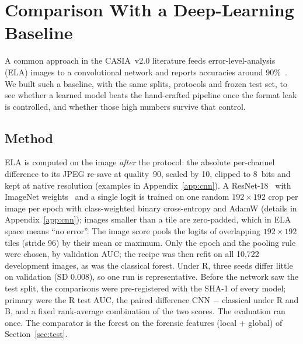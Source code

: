 \section{Comparison With a Deep-Learning Baseline}\label{sec:cnn}

A common approach in the CASIA~v2.0 literature feeds error-level-analysis (ELA) images to a convolutional network and
reports accuracies around 90\%~\cite{sudiatmika2019ela,ali2022recompress}. We built such a baseline, with the same
splits, protocols and frozen test set, to see whether a learned model beats the hand-crafted pipeline once the format
leak is controlled, and whether those high numbers survive that control.

\subsection{Method}\label{sec:cnn-method}

ELA is computed on the image \emph{after} the protocol: the absolute per-channel difference to its JPEG re-save at
quality~90, scaled by 10, clipped to 8~bits and kept at native resolution (examples in Appendix~\ref{app:cnn}). A
ResNet-18~\cite{he2016resnet} with ImageNet weights~\cite{deng2009imagenet} and a single logit is trained on one random
$192\times192$ crop per image per epoch with class-weighted binary cross-entropy and AdamW (details in
Appendix~\ref{app:cnn}); images smaller than a tile are zero-padded, which in ELA space means ``no error''. The image
score pools the logits of overlapping $192\times192$ tiles (stride 96) by their mean or maximum. Only the epoch and the
pooling rule were chosen, by validation AUC; the recipe was then refit on all 10,722 development images, as was the
classical forest. Under R, three seeds differ little on validation (SD 0.008), so one run is representative. Before
the network saw the test split, the comparisons were pre-registered with the SHA-1 of every model; primary were the R
test AUC, the paired difference CNN $-$ classical under R and B, and a fixed rank-average combination of the two
scores. The evaluation ran once. The comparator is the forest on the forensic features (local + global) of
Section~\ref{sec:test}.

